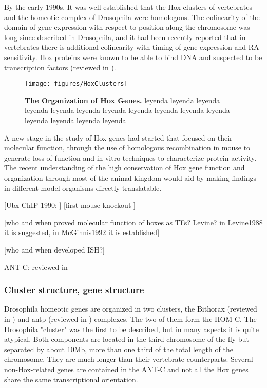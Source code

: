 By the early 1990s, It was well established that the Hox clusters of vertebrates and the homeotic complex of Drosophila were homologous. The colinearity of the domain of gene expression with respect to position along the chromosome was long since described in  Drosophila, and it had been recently reported that in vertebrates there is additional colinearity with timing of gene expression and RA sensitivity. Hox proteins were known to be able to bind DNA and suspected to be transcription factors (reviewed in \cite{Levine1988, McGinnis1992}). 

\begin{figure}[]
  
  \centering
  \label{fig:hoxclusters}
  \texttt{[image: figures/HoxClusters]}
  \caption[The Organization of Hox Genes]{\textbf{The Organization of Hox Genes.} leyenda leyenda leyenda leyenda leyenda leyenda leyenda leyenda leyenda leyenda leyenda leyenda leyenda leyenda leyenda}
\end{figure}

A new stage in the study of Hox genes had started that focused on their molecular function, through the use of homologous recombination in mouse to generate loss of function and in vitro techniques to characterize protein activity. The recent understanding of the high conservation of Hox gene function and organization through most of the animal kingdom would aid by making findings in different model organisms directly translatable. 

[Ubx ChIP 1990: \cite{Gould1990}]
[first mouse knockout \cite{Thomas1987}]



[who and when proved molecular function of hoxes as TFs? Levine? in Levine1988 it is suggested, in McGinnis1992 it is established]

[who and when developed ISH?]


\ac{ANT-C}: reviewed in \cite{Kaufman1990}




\subsubsection{Cluster structure, gene structure}


Drosophila homeotic genes are organized in two clusters, the  Bithorax (reviewed in \cite{Lewis1978}) and \ac{antp} (reviewed in \cite{Kaufman1990}) complexes. The two of them form the HOM-C. The Drosophila "cluster" was the first to be described, but in many aspects it is quite atypical. Both components are located in the third chromosome of the fly but separated by about 10Mb, more than one third of the total length of the chromosome. They are much longer than their vertebrate counterparts. Several non-Hox-related genes are contained in the \ac{ANT-C} and not all the Hox genes share the same transcriptional orientation. 

